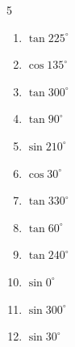 \begin{multicols}{5}
\begin{enumerate}

  \item $\displaystyle \tan{225^\circ}$

        \phantom{$\displaystyle =1$}

  \item $\displaystyle \cos{135^\circ}$


  \item $\displaystyle \tan{300^\circ}$


  \item $\displaystyle \tan{90^\circ}$

        \phantom{$\displaystyle なし$}

  \item $\displaystyle \sin{210^\circ}$


  \item $\displaystyle \cos{30^\circ}$


  \item $\displaystyle \tan{330^\circ}$


  \item $\displaystyle \tan{60^\circ}$


  \item $\displaystyle \tan{240^\circ}$


  \item $\displaystyle \sin{0^\circ}$

        \phantom{$\displaystyle =0$}

  \item $\displaystyle \sin{300^\circ}$


\columnbreak %

  \item $\displaystyle \sin{30^\circ}$



\end{enumerate}
\end{multicols}
